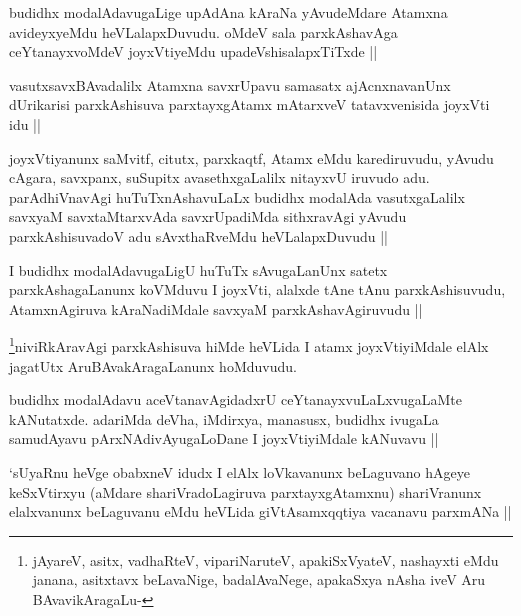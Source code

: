 \begin{artha}
budidhx modalAdavugaLige upAdAna kAraNa yAvudeMdare Atamxna avideyxyeMdu heVLalapxDuvudu. oMdeV sala parxkAshavAga ceYtanayxvoMdeV joyxVtiyeMdu upadeVshisalapxTiTxde ||
\end{artha}

\begin{artha}
vasutxsavxBAvadalilx Atamxna savxrUpavu samasatx ajAcnxnavanUnx dUrikarisi parxkAshisuva parxtayxgAtamx mAtarxveV tatavxvenisida joyxVti idu ||
\end{artha}

\begin{artha}
joyxVtiyanunx saMvitf, citutx, parxkaqtf, Atamx eMdu karediruvudu, yAvudu cAgara, savxpanx, suSupitx avasethxgaLalilx nitayxvU iruvudo adu. parAdhiVnavAgi huTuTxnAshavuLaLx budidhx modalAda vasutxgaLalilx savxyaM savxtaMtarxvAda savxrUpadiMda sithxravAgi yAvudu parxkAshisuvadoV adu sAvxthaRveMdu heVLalapxDuvudu ||
\end{artha}

\begin{artha}
I budidhx modalAdavugaLigU huTuTx sAvugaLanUnx satetx parxkAshagaLanunx koVMduvu I joyxVti, alalxde tAne tAnu parxkAshisuvudu, AtamxnAgiruva kAraNadiMdale savxyaM parxkAshavAgiruvudu ||
\end{artha}

\begin{artha}
\footnote{jAyareV, asitx, vadhaRteV, vipariNaruteV, apakiSxVyateV, nashayxti eMdu janana, asitxtavx beLavaNige, badalAvaNege, apakaSxya nAsha iveV Aru BAvavikAragaLu-}niviRkAravAgi parxkAshisuva hiMde heVLida I atamx joyxVtiyiMdale elAlx jagatUtx AruBAvakAragaLanunx hoMduvudu.
\end{artha}

\begin{artha}
budidhx modalAdavu aceVtanavAgidadxrU ceYtanayxvuLaLxvugaLaMte kANutatxde. adariMda deVha, iMdirxya, manasusx, budidhx ivugaLa samudAyavu pArxNAdivAyugaLoDane I joyxVtiyiMdale kANuvavu ||
\end{artha}

\begin{artha}
`sUyaRnu heVge obabxneV idudx I elAlx loVkavanunx beLaguvano hAgeye keSxVtirxyu (aMdare shariVradoLagiruva parxtayxgAtamxnu) shariVranunx elalxvanunx beLaguvanu eMdu heVLida giVtAsamxqqtiya vacanavu parxmANa ||
\end{artha}

